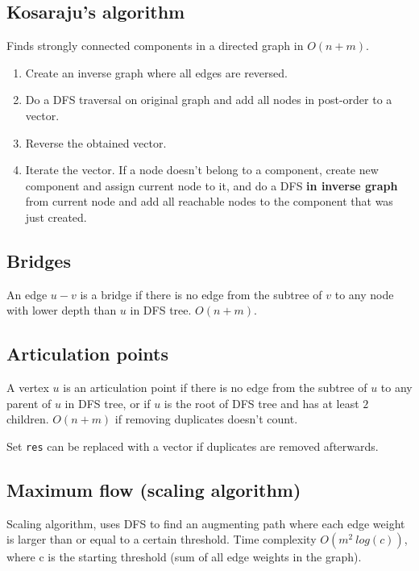 \documentclass{article}
\begin{document}
\subsection {Kosaraju's algorithm}

Finds strongly connected components in a directed graph in $O(n + m)$.

\begin{enumerate}
	\item Create an inverse graph where all edges are reversed.
	\item Do a DFS traversal on original graph and add all nodes in post-order to a vector.
	\item Reverse the obtained vector.
	\item Iterate the vector. If a node doesn't belong to a component, create new component and assign current node to it, and do a DFS \textbf{in inverse graph} from current node and add all reachable nodes to the component that was just created.
\end{enumerate}

\subsection {Bridges}

An edge $u-v$ is a bridge if there is no edge from the subtree of $v$ to any node with lower depth than $u$ in DFS tree. $O(n+m)$.



\subsection {Articulation points}

A vertex $u$ is an articulation point if there is no edge from the subtree of $u$ to any parent of $u$ in DFS tree, or if $u$ is the root of DFS tree and has at least $2$ children. $O(n+m)$ if removing duplicates doesn't count.

Set \texttt{res} can be replaced with a vector if duplicates are removed afterwards.



\subsection {Maximum flow (scaling algorithm)}

Scaling algorithm, uses DFS to find an augmenting path where each edge weight is larger than or equal to a certain threshold. Time complexity $O(m^2 \ log(c))$, where c is the starting threshold (sum of all edge weights in the graph).
\end{document}
